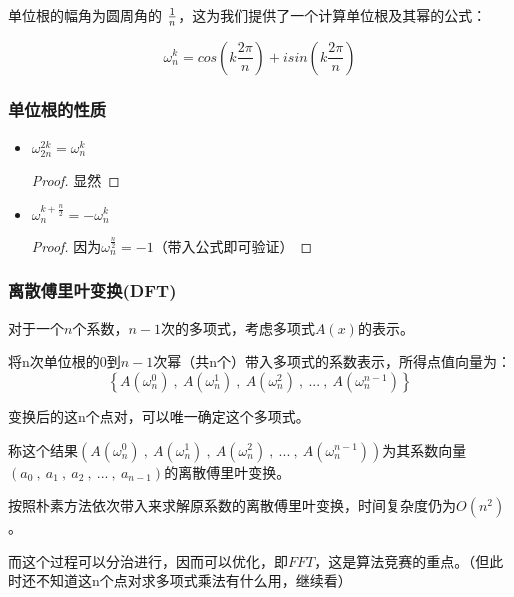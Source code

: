 单位根的幅角为圆周角的 $1 \over n$，这为我们提供了一个计算单位根及其幂的公式：

$$
\omega_n^k=cos(k\frac{2\pi}{n})+isin(k\frac{2\pi}{n})
$$

\subsubsection{单位根的性质}
\begin{itemize}
\item  $\omega_{2n}^{2k}=\omega_n^k$   
\begin{proof}
显然
\end{proof}

\vbox{}

\item  $\omega_n^{k+\frac{n}{2}}=-\omega_n^{k}$
\begin{proof}
  因为$\omega_n^{\frac{n}{2}}=-1$（带入公式即可验证）
\end{proof}
\end{itemize}

\subsubsection{离散傅里叶变换(DFT)}

对于一个$n$个系数，$n-1$次的多项式，考虑多项式$A(x)$的表示。

将n次{\heiti 单位根的0到$n-1$次幂}（共n个）带入多项式的系数表示，所得点值向量为：
$$
\left \{  A(\omega_n^0)\ ,\ A(\omega_n^1)\ ,\ A(\omega_n^2)\ ,\ ...\ ,\ A(\omega_n^{n-1}) \right \}
$$
\begin{note}
变换后的这n个点对，可以唯一确定这个多项式。
\end{note}

称这个结果$(A(\omega_n^0)\ ,\ A(\omega_n^1)\ ,\ A(\omega_n^2)\ ,\ ...\ ,\ A(\omega_n^{n-1}))$为其系数向量$(a_0\ ,\ a_1\ ,\ a_2\ ,\ ...\ ,\ a_{n-1})$的{\heiti 离散傅里叶变换}。

按照朴素方法依次带入来求解原系数的离散傅里叶变换，时间复杂度仍为$O(n^2)$。

而这个过程可以{\heiti 分治进行}，因而可以优化，即$FFT$，这是算法竞赛的重点。（{\heiti 但此时还不知道这n个点对求多项式乘法有什么用，继续看}）



